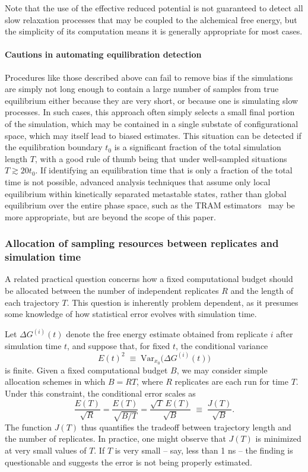 \documentclass[9pt,bestpractices]{livecoms}
\begin{document}
Note that the use of the effective reduced potential is not guaranteed to detect all slow relaxation processes that may be coupled to the alchemical free energy, but the simplicity of its computation means it is generally appropriate for most cases.

\paragraph{Cautions in automating equilibration detection}

Procedures like those described above can fail to remove bias if the simulations are simply not long enough to contain a large number of samples from true equilibrium either because they are very short, or because one is simulating slow processes. In such cases, this approach often simply selects a small final portion of the simulation, which may be contained in a single substate of configurational space, which may itself lead to biased estimates. 
This situation can be detected if the equilibration boundary $t_0$ is a significant fraction of the total simulation length $T$, with a good rule of thumb being that under well-sampled situations $T \gtrsim 20 t_0$.
If identifying an equilibration time that is only a fraction of the total time is not possible, advanced analysis techniques that assume only local equilibrium within kinetically separated metastable states, rather than global equilibrium over the entire phase space, such as the TRAM estimators~\cite{mey2014xtram,wu2016multiensemble,nuske2017markov} may be more appropriate, but are beyond the scope of this paper.

\subsubsection{Allocation of sampling resources between replicates and simulation time}

A related practical question concerns how a fixed computational budget should be allocated between the number of independent replicates $R$ and the length of each trajectory $T$. This question is inherently problem dependent, as it presumes some knowledge of how statistical error evolves with simulation time. 

Let $\Delta G^{(i)}(t)$ denote the free energy estimate obtained from replicate $i$ after simulation time $t$, and suppose that, for fixed $t$, the conditional variance 
\[
E(t)^2 \;\equiv\; \mathrm{Var}_{x_0}\!\bigl(\Delta G^{(i)}(t)\bigr)
\]
is finite. Given a fixed computational budget $B$, we may consider simple allocation schemes in which $B = RT$, where $R$ replicates are each run for time $T$. Under this constraint, the conditional error scales as
\[
\frac{E(T)}{\sqrt{R}}
= \frac{E(T)}{\sqrt{B/T}}
= \frac{\sqrt{T}\,E(T)}{\sqrt{B}}
\;\equiv\; \frac{J(T)}{\sqrt{B}}.
\]
The function $J(T)$ thus quantifies the tradeoff between trajectory length and the number of replicates. In practice, one might observe that $J(T)$ is minimized at very small values of $T$. If $T$ is very small -- say, less than 1 ns -- the finding is questionable and suggests the error is not being properly estimated. 
\end{document}
